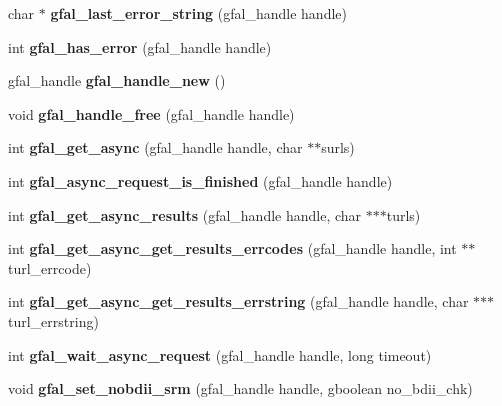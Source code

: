 \begin{CompactItemize}
\item 
char $\ast$ \textbf{gfal\_\-last\_\-error\_\-string} (gfal\_\-handle handle)\label{gfal__common__interface_8h_bdebd69c0c6a74b1b5adf88b5e836d8a}

\item 
int \textbf{gfal\_\-has\_\-error} (gfal\_\-handle handle)\label{gfal__common__interface_8h_ad28f1c5d1a0ed623834e6133bb7dd2e}

\item 
gfal\_\-handle \textbf{gfal\_\-handle\_\-new} ()\label{gfal__common__interface_8h_4211faf02a3c5cc696c7c9f974415d11}

\item 
void \textbf{gfal\_\-handle\_\-free} (gfal\_\-handle handle)\label{gfal__common__interface_8h_0071cb3665f7dca9648fa46bebeca524}

\item 
int \textbf{gfal\_\-get\_\-async} (gfal\_\-handle handle, char $\ast$$\ast$surls)\label{gfal__common__interface_8h_68ef05f37b4971c8306b1cc6ee529647}

\item 
int \textbf{gfal\_\-async\_\-request\_\-is\_\-finished} (gfal\_\-handle handle)\label{gfal__common__interface_8h_ce6fcac8e92ad2e1d699eed2ce74a257}

\item 
int \textbf{gfal\_\-get\_\-async\_\-results} (gfal\_\-handle handle, char $\ast$$\ast$$\ast$turls)\label{gfal__common__interface_8h_0c654545b837b8e1928842ee762ce5e9}

\item 
int \textbf{gfal\_\-get\_\-async\_\-get\_\-results\_\-errcodes} (gfal\_\-handle handle, int $\ast$$\ast$turl\_\-errcode)\label{gfal__common__interface_8h_a3161f12f9d5c8151f44df4f132602cb}

\item 
int \textbf{gfal\_\-get\_\-async\_\-get\_\-results\_\-errstring} (gfal\_\-handle handle, char $\ast$$\ast$$\ast$turl\_\-errstring)\label{gfal__common__interface_8h_ecd7d68b18088ff620d21dbef85862ae}

\item 
int \textbf{gfal\_\-wait\_\-async\_\-request} (gfal\_\-handle handle, long timeout)\label{gfal__common__interface_8h_08c8573e050334d5342a31a48b7db4cb}

\item 
void \textbf{gfal\_\-set\_\-nobdii\_\-srm} (gfal\_\-handle handle, gboolean no\_\-bdii\_\-chk)\label{gfal__common__interface_8h_5e3afd0690b23dedf14d6fa7898f28a9}

\end{CompactItemize}


